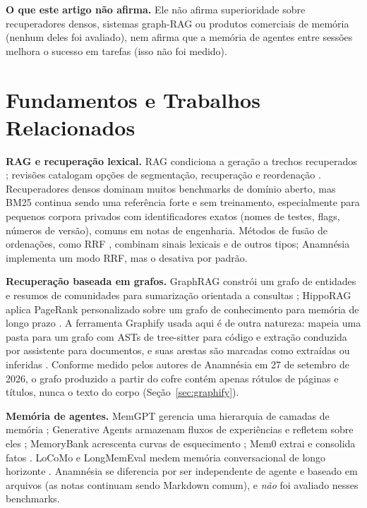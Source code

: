 \documentclass[conference,onecolumn,11pt]{IEEEtran}
\newcommand{\anam}{Anam\-n\'esia}
\begin{document}
\textbf{O que este artigo não afirma.} Ele não afirma superioridade sobre recuperadores densos, sistemas graph-RAG ou produtos comerciais de memória (nenhum deles foi avaliado), nem afirma que a memória de agentes entre sessões melhora o sucesso em tarefas (isso não foi medido).

\section{Fundamentos e Trabalhos Relacionados}
\textbf{RAG e recuperação lexical.} RAG condiciona a geração a trechos recuperados \cite{lewis2020rag}; revisões catalogam opções de segmentação, recuperação e reordenação \cite{gao2023ragsurvey}. Recuperadores densos \cite{karpukhin2020dpr} dominam muitos benchmarks de domínio aberto, mas BM25 \cite{robertson2009bm25} continua sendo uma referência forte e sem treinamento, especialmente para pequenos corpora privados com identificadores exatos (nomes de testes, flags, números de versão), comuns em notas de engenharia. Métodos de fusão de ordenações, como RRF \cite{cormack2009rrf}, combinam sinais lexicais e de outros tipos; \anam{} implementa um modo RRF, mas o desativa por padrão.

\textbf{Recuperação baseada em grafos.} GraphRAG constrói um grafo de entidades e resumos de comunidades para sumarização orientada a consultas \cite{edge2024graphrag}; HippoRAG aplica PageRank personalizado sobre um grafo de conhecimento para memória de longo prazo \cite{gutierrez2024hipporag,page1999pagerank}. A ferramenta Graphify usada aqui é de outra natureza: mapeia uma pasta para um grafo com ASTs de tree-sitter para código e extração conduzida por assistente para documentos, e suas arestas são marcadas como extraídas ou inferidas \cite{graphify}. Conforme medido pelos autores de \anam{} em 27 de setembro de 2026, o grafo produzido a partir do cofre contém apenas rótulos de páginas e títulos, nunca o texto do corpo (Seção~\ref{sec:graphify}).

\textbf{Memória de agentes.} MemGPT gerencia uma hierarquia de camadas de memória \cite{packer2023memgpt}; Generative Agents armazenam fluxos de experiências e refletem sobre eles \cite{park2023generative}; MemoryBank acrescenta curvas de esquecimento \cite{zhong2024memorybank}; Mem0 extrai e consolida fatos \cite{chhikara2025mem0}. LoCoMo e LongMemEval medem memória conversacional de longo horizonte \cite{maharana2024locomo,wu2025longmemeval}. \anam{} se diferencia por ser independente de agente e baseado em arquivos (as notas continuam sendo Markdown comum), e \emph{não} foi avaliado nesses benchmarks.
\end{document}
